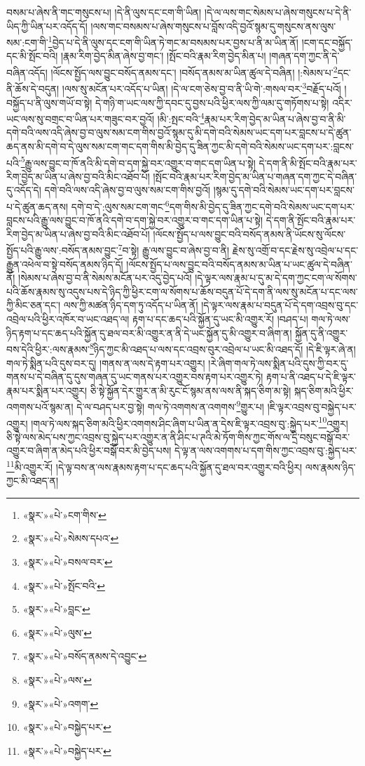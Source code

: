 བསམ་པ་ཞེས་ནི་གང་གསུངས་པ། །དེ་ནི་ལུས་དང་ངག་གི་ཡིན། །དེ་ལ་ལས་གང་སེམས་པ་ཞེས་གསུངས་པ་དེ་ནི་ཡིད་ཀྱི་ཡིན་པར་འདོད་དོ། །ལས་གང་བསམས་པ་ཞེས་གསུངས་པ་བློས་འདི་བྱའོ་སྙམ་དུ་གསུངས་ནས་ལུས་སམ་:ངག་གི་\footnote{«སྣར་»«པེ་»ངག་གིས་}བྱེད་པ་དེ་ནི་ལུས་དང་ངག་གི་ཡིན་ཏེ་གང་མ་བསམས་པར་བྱས་པ་ནི་མ་ཡིན་ནོ། །ངག་དང་བསྐྱོད་དང་མི་སྤོང་བའི། །རྣམ་རིག་བྱེད་མིན་ཞེས་བྱ་གང་། །སྤོང་བའི་རྣམ་རིག་བྱེད་མིན་པ། །གཞན་དག་ཀྱང་ནི་དེ་བཞིན་འདོད། །ལོངས་སྤྱོད་ལས་བྱུང་བསོད་ནམས་དང་། །བསོད་ནམས་མ་ཡིན་ཚུལ་དེ་བཞིན། །:སེམས་པ་\footnote{«སྣར་»«པེ་»སེམས་དཔའ་}དང་ནི་ཆོས་དེ་བདུན། །ལས་སུ་མངོན་པར་འདོད་པ་ཡིན། །དེ་ལ་ངག་ཅེས་བྱ་བ་ནི་ཡི་གེ་:གསལ་བར་\footnote{«སྣར་»«པེ་»བསལ་བར་}བརྗོད་པའོ། །བསྐྱོད་པ་ནི་ལུས་གཡོ་བ་སྟེ། དེ་གཉི་ག་ཡང་ལས་ཀྱི་དབང་དུ་བྱས་པའི་ཕྱིར་ལས་ཀྱི་ལམ་དུ་གཏོགས་པ་སྟེ། འདིར་ཡང་ལས་སུ་བགྲང་བ་ཡིན་པར་གཟུང་བར་བྱའོ། །མི་:སྤང་བའི་\footnote{«སྣར་»«པེ་»སྤོང་བའི་}རྣམ་པར་རིག་བྱེད་མ་ཡིན་པ་ཞེས་བྱ་བ་ནི་མི་དགེ་བའི་ལས་འདི་ཞེས་བྱ་བ་ལུས་སམ་ངག་གིས་བྱའོ་སྙམ་དུ་མི་དགེ་བའི་སེམས་ཡང་དག་པར་བླངས་པ་དེ་ཚུན་ཆད་ནས་མི་དགེ་བ་དེ་ལུས་སམ་ངག་གང་དག་གིས་མི་བྱེད་དུ་ཟིན་ཀྱང་མི་དགེ་བའི་སེམས་ཡང་དག་པར་:བླངས་པའི་\footnote{«སྣར་»«པེ་»བླང་}རྒྱུ་ལས་བྱུང་བ་ཁོ་ནའི་མི་དགེ་བ་དག་སྐྱེ་བར་འགྱུར་བ་གང་དག་ཡིན་པ་སྟེ། དེ་དག་ནི་མི་སྤོང་བའི་རྣམ་པར་རིག་བྱེད་མ་ཡིན་པ་ཞེས་བྱ་བའི་མིང་འཐོབ་པོ། །སྤོང་བའི་རྣམ་པར་རིག་བྱེད་མ་ཡིན་པ་གཞན་དག་ཀྱང་དེ་བཞིན་དུ་འདོད་དེ། དགེ་བའི་ལས་འདི་ཞེས་བྱ་བ་ལུས་སམ་ངག་གིས་བྱའོ། །སྙམ་དུ་དགེ་བའི་སེམས་ཡང་དག་པར་བླངས་པ་དེ་ཚུན་ཆད་ནས། དགེ་བ་དེ་:ལུས་སམ་ངག་གང་\footnote{«སྣར་»«པེ་»ལུས་}དག་གིས་མི་བྱེད་དུ་ཟིན་ཀྱང་དགེ་བའི་སེམས་ཡང་དག་པར་བླངས་པའི་རྒྱུ་ལས་བྱུང་བ་ཁོ་ནའི་དགེ་བ་དག་སྐྱེ་བར་འགྱུར་བ་གང་དག་ཡིན་པ་སྟེ། དེ་དག་ནི་སྤོང་བའི་རྣམ་པར་རིག་བྱེད་མ་ཡིན་པ་ཞེས་བྱ་བའི་མིང་འཐོབ་པོ། །ལོངས་སྤྱོད་པ་ལས་བྱུང་བའི་བསོད་ནམས་ནི་ཡོངས་སུ་ལོངས་སྤྱོད་པའི་རྒྱུ་ལས་:བསོད་ནམས་བྱུང་\footnote{«སྣར་»«པེ་»བསོད་ནམས་དེ་འབྱུང་}བ་སྟེ། རྒྱུ་ལས་བྱུང་བ་ཞེས་བྱ་བ་ནི། རྗེས་སུ་འགྲོ་བ་དང་རྗེས་སུ་འབྲེལ་པ་དང་རྒྱུན་འཕེལ་བ་སྟེ་བསོད་ནམས་ཉིད་དོ། །ལོངས་སྤྱོད་པ་ལས་བྱུང་བའི་བསོད་ནམས་མ་ཡིན་པ་ཡང་ཚུལ་དེ་བཞིན་ནོ། །སེམས་པ་ཞེས་བྱ་བ་ནི་སེམས་མངོན་པར་འདུ་བྱེད་པའོ། །དེ་ལྟར་ལས་རྣམ་པ་དུ་མ་དེ་དག་ཀྱང་ངག་ལ་སོགས་པའི་ཆོས་རྣམས་སུ་འདུས་པས་དེ་ཉིད་ཀྱི་ཕྱིར་ངག་ལ་སོགས་པ་ཆོས་བདུན་པོ་དེ་དག་ནི་ལས་སུ་མངོན་པ་དང་ལས་ཀྱི་མིང་ཅན་དང་། ལས་ཀྱི་མཚན་ཉིད་དག་ཏུ་འདོད་པ་ཡིན་ནོ། །དེ་ལྟར་ལས་རྣམ་པ་བདུན་པོ་དེ་དག་འབྲས་བུ་དང་འབྲེལ་པའི་ཕྱིར་འཁོར་བ་ཡང་འཐད་ལ། རྟག་པ་དང་ཆད་པའི་སྐྱོན་དུ་ཡང་མི་འགྱུར་རོ། །བཤད་པ། གལ་ཏེ་ལས་ཉིད་རྟག་པ་དང་ཆད་པའི་སྐྱོན་དུ་ཐལ་བར་མི་འགྱུར་ན་ནི་དེ་ཡང་སྐྱོན་དུ་མི་འགྱུར་བ་ཞིག་ན། སྐྱོན་དུ་ནི་འགྱུར་བས་དེའི་ཕྱིར་:ལས་རྣམས་\footnote{«སྣར་»«པེ་»ལས་}ཉིད་ཀྱང་མི་འཐད་པ་ལས་དང་འབྲས་བུར་འབྲེལ་པ་ཡང་མི་འཐད་དོ། །དེ་ཇི་ལྟར་ཞེ་ན། གལ་ཏེ་སྨིན་པའི་དུས་བར་དུ། །གནས་ན་ལས་དེ་རྟག་པར་འགྱུར། །རེ་ཞིག་གལ་ཏེ་ལས་སྨིན་པའི་དུས་ཀྱི་བར་དུ་གནས་པ་དེ་བཞིན་དུ་དུས་གཞན་དུ་ཡང་གནས་པར་འགྱུར་བས་རྟག་པར་འགྱུར་ཏེ། རྟག་པ་ནི་འཐད་པ་དེ་ཇི་ལྟར་རྣམ་པར་སྨིན་པར་འགྱུར། ཅི་སྟེ་སྐྱོན་དེར་གྱུར་ན་མི་རུང་ངོ་སྙམ་ནས་ལས་ནི་སྐད་ཅིག་མ་སྟེ། སྐད་ཅིག་མའི་ཕྱིར་འགགས་པའོ་སྙམ་ན། དེ་ལ་བཤད་པར་བྱ་སྟེ། གལ་ཏེ་འགགས་ན་འགགས་\footnote{«སྣར་»«པེ་»འགག་}གྱུར་པ། །ཇི་ལྟར་འབྲས་བུ་བསྐྱེད་པར་འགྱུར། །གལ་ཏེ་ལས་སྐད་ཅིག་མའི་ཕྱིར་འགགས་ཤིང་ཞིག་པ་ཡིན་ན་དེས་ཇི་ལྟར་འབྲས་བུ་:སྐྱེད་པར་\footnote{«སྣར་»«པེ་»བསྐྱེད་པར་}འགྱུར། ཅི་སྟེ་ལས་མེད་པས་ཀྱང་འབྲས་བུ་སྐྱེད་པར་འགྱུར་ན་ནི་ཤིང་པ་ཊའི་མེ་ཏོག་གིས་ཀྱང་གོས་ལ་དྲི་བསུང་བསྒོ་བར་འགྱུར་བ་ཞིག་ན་མེད་པའི་ཕྱིར་བསྒོ་བར་མི་བྱེད་པས། དེ་ལྟ་ན་ལས་འགགས་པ་དག་གིས་ཀྱང་འབྲས་བུ་:སྐྱེད་པར་\footnote{«སྣར་»«པེ་»བསྐྱེད་པར་}མི་འགྱུར་རོ། །དེ་ལྟ་བས་ན་ལས་རྣམས་རྟག་པ་དང་ཆད་པའི་སྐྱོན་དུ་ཐལ་བར་འགྱུར་བའི་ཕྱིར། ལས་རྣམས་ཉིད་ཀྱང་མི་འཐད་ན། 